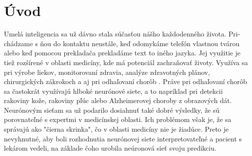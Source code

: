 \chapter{Úvod}


Umelá inteligencia sa už dávno stala súčasťou nášho každodenného života. Pri-chádzame s ňou do kontaktu neustále, keď odomykáme telefón vlastnou tvárou alebo keď pomocou prekladača prekladáme text to iného jazyka. 
Jej využitie je tiež rozšírené v oblasti medicíny, kde má potenciál zachraňovať životy. Využíva sa pri výrobe liekov, monitorovaní zdravia, analýze zdravotných plánov, chirurgických zákrokoch a aj pri odhaľovaní chorôb \cite{amisha2019overview}.
Práve pri odhaľovaní chorôb sa častokrát využívajú hlboké neurónové siete, a to napríklad pri detekcii rakoviny kože, rakoviny pľúc alebo Alzheimerovej choroby z obrazových dát.
Neurónovým sieťam sa už podarilo dosiahnuť také dobré výsledky, že sú porovnateľné s expertmi v medicínskej oblasti.
Ich problémom však je, že sa správajú ako "čierna skrinka", čo v oblasti medicíny nie je žiadúce. Preto je nevyhnutné, aby boli rozhodnutia neurónovej siete interpretovateľné a pacient s lekárom vedeli, na základe čoho urobila neúronová sieť svoju predikciu.